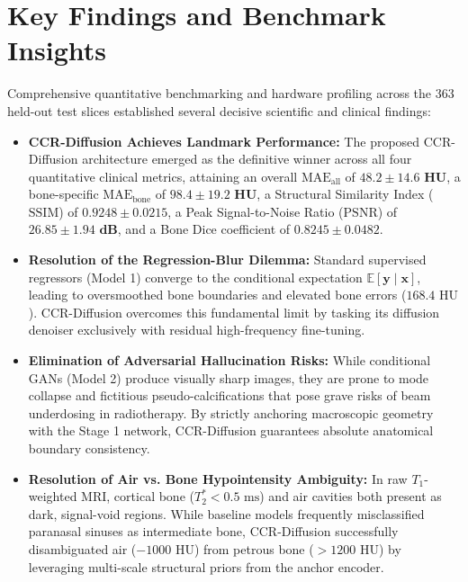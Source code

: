 \section{Key Findings and Benchmark Insights}
Comprehensive quantitative benchmarking and hardware profiling across the 363 held-out test slices established several decisive scientific and clinical findings:
\begin{itemize}
    \item \textbf{CCR-Diffusion Achieves Landmark Performance:} The proposed CCR-Diffusion architecture emerged as the definitive winner across all four quantitative clinical metrics, attaining an overall $\text{MAE}_{\text{all}}$ of $\mathbf{48.2 \pm 14.6\text{ HU}}$, a bone-specific $\text{MAE}_{\text{bone}}$ of $\mathbf{98.4 \pm 19.2\text{ HU}}$, a Structural Similarity Index ($\text{SSIM}$) of $\mathbf{0.9248 \pm 0.0215}$, a Peak Signal-to-Noise Ratio ($\text{PSNR}$) of $\mathbf{26.85 \pm 1.94\text{ dB}}$, and a Bone Dice coefficient of $\mathbf{0.8245 \pm 0.0482}$.
    \item \textbf{Resolution of the Regression-Blur Dilemma:} Standard supervised regressors (Model 1) converge to the conditional expectation $\mathbb{E}[\mathbf{y} \mid \mathbf{x}]$, leading to oversmoothed bone boundaries and elevated bone errors ($168.4\text{ HU}$). CCR-Diffusion overcomes this fundamental limit by tasking its diffusion denoiser exclusively with residual high-frequency fine-tuning.
    \item \textbf{Elimination of Adversarial Hallucination Risks:} While conditional GANs (Model 2) produce visually sharp images, they are prone to mode collapse and fictitious pseudo-calcifications that pose grave risks of beam underdosing in radiotherapy. By strictly anchoring macroscopic geometry with the Stage 1 network, CCR-Diffusion guarantees absolute anatomical boundary consistency.
    \item \textbf{Resolution of Air vs. Bone Hypointensity Ambiguity:} In raw $T_1$-weighted MRI, cortical bone ($T_2^* < 0.5\text{ ms}$) and air cavities both present as dark, signal-void regions. While baseline models frequently misclassified paranasal sinuses as intermediate bone, CCR-Diffusion successfully disambiguated air ($-1000\text{ HU}$) from petrous bone ($> 1200\text{ HU}$) by leveraging multi-scale structural priors from the anchor encoder.

\end{itemize}
